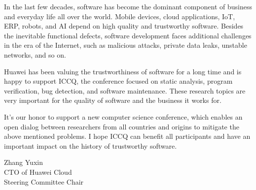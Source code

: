 \clearpage
{}

In the last few decades, software has become the dominant component of business and everyday life all over the world. Mobile devices, cloud applications, IoT, ERP, robots, and AI depend on high quality and trustworthy software. Besides the inevitable functional defects, software development faces additional challenges in the era of the Internet, such as malicious attacks, private data leaks, unstable networks, and so on.

Huawei has been valuing the trustworthiness of software for a long time and is happy to support ICCQ, the conference focused on static analysis, program verification, bug detection, and software maintenance. These research topics are very important for the quality of software and the business it works for.

It's our honor to support a new computer science conference, which enables an open dialog between researchers from all countries and origins to mitigate the above mentioned problems. I hope ICCQ can benefit all participants and have an important impact on the history of trustworthy software.

Zhang Yuxin \\
CTO of Huawei Cloud \\
Steering Committee Chair
